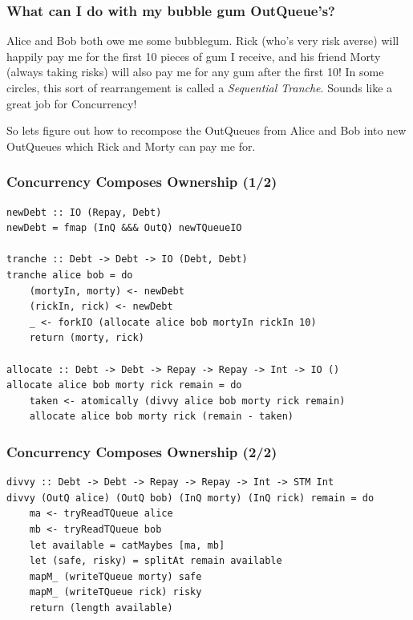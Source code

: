 \documentclass[11pt,reqno]{beamer}
\begin{document}
\begin{frame}
  \frametitle{What can I do with my bubble gum OutQueue's?}
Alice and Bob both owe me some bubblegum. Rick (who's very risk averse) will happily pay me
for the first 10 pieces of gum I receive, and his friend Morty (always taking risks) will
also pay me for any gum after the first 10! In some circles, this sort of rearrangement
is called a \emph{Sequential Tranche}. Sounds like a great job for Concurrency!


So lets figure out how to recompose the OutQueues from Alice and Bob into new
OutQueues which Rick and Morty can pay me for.

\end{frame}

\begin{frame}[fragile]
\frametitle{Concurrency Composes Ownership (1/2)}

\begin{verbatim}
newDebt :: IO (Repay, Debt)
newDebt = fmap (InQ &&& OutQ) newTQueueIO

tranche :: Debt -> Debt -> IO (Debt, Debt)
tranche alice bob = do
    (mortyIn, morty) <- newDebt
    (rickIn, rick) <- newDebt
    _ <- forkIO (allocate alice bob mortyIn rickIn 10)
    return (morty, rick)

allocate :: Debt -> Debt -> Repay -> Repay -> Int -> IO ()
allocate alice bob morty rick remain = do
    taken <- atomically (divvy alice bob morty rick remain)
    allocate alice bob morty rick (remain - taken)
\end{verbatim}
\end{frame}

\begin{frame}[fragile]
\frametitle{Concurrency Composes Ownership (2/2)}

\begin{verbatim}
divvy :: Debt -> Debt -> Repay -> Repay -> Int -> STM Int
divvy (OutQ alice) (OutQ bob) (InQ morty) (InQ rick) remain = do
    ma <- tryReadTQueue alice
    mb <- tryReadTQueue bob
    let available = catMaybes [ma, mb]
    let (safe, risky) = splitAt remain available
    mapM_ (writeTQueue morty) safe
    mapM_ (writeTQueue rick) risky
    return (length available)
\end{verbatim}
\end{frame}

\end{document}
